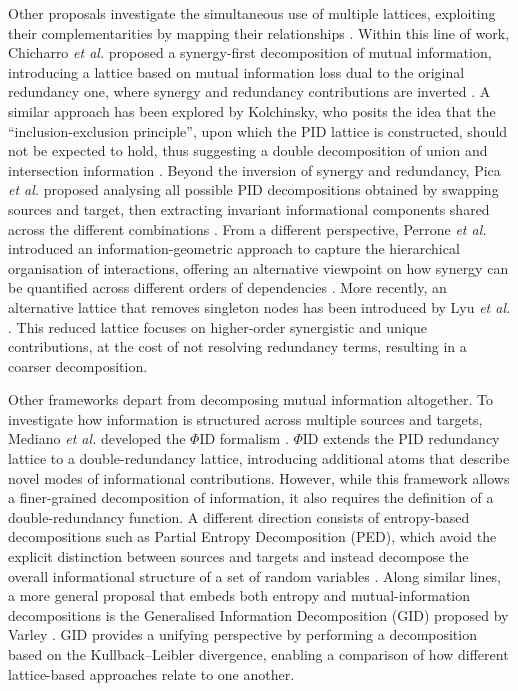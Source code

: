 \documentclass{article}
\makeatletter
\newcommand{\etal}{\textit{et al.\@} }
\makeatother
\begin{document}
Other proposals investigate the simultaneous use of multiple lattices, exploiting their complementarities by mapping their relationships \cite{chicharro2017synergy, kolchinsky2022novel}.
Within this line of work, Chicharro \etal proposed a synergy-first decomposition of mutual information, introducing a lattice based on mutual information loss dual to the original redundancy one, where synergy and redundancy contributions are inverted \cite{chicharro2017synergy}.
A similar approach has been explored by Kolchinsky, who posits the idea that the ``inclusion-exclusion principle'', upon which the PID lattice is constructed, should not be expected to hold, thus suggesting a double decomposition of union and intersection information \cite{kolchinsky2022novel}.
Beyond the inversion of synergy and redundancy, Pica \etal proposed analysing all possible PID decompositions obtained by swapping sources and target, then extracting invariant informational components shared across the different combinations \cite{pica2017invariant}.
From a different perspective, Perrone \etal introduced an information-geometric approach to capture the hierarchical organisation of interactions, offering an alternative viewpoint on how synergy can be quantified across different orders of dependencies \cite{perrone2016hierarchical}. 
More recently, an alternative lattice that removes singleton nodes has been introduced by Lyu \etal \cite{lyu2025whole}. 
This reduced lattice focuses on higher-order synergistic and unique contributions, at the cost of not resolving redundancy terms, resulting in a coarser decomposition. 

Other frameworks depart from decomposing mutual information altogether. 
To investigate how information is structured across multiple sources and targets, Mediano \etal developed the $\Phi$ID formalism \cite{mediano2025toward}. $\Phi$ID extends the PID redundancy lattice to a double-redundancy lattice, introducing additional atoms that describe novel modes of informational contributions. 
However, while this framework allows a finer-grained decomposition of information, it also requires the definition of a double-redundancy function.
A different direction consists of entropy-based decompositions such as Partial Entropy Decomposition (PED), which avoid the explicit distinction between sources and targets and instead decompose the overall informational structure of a set of random variables \cite{ince2017partial, varley2023partial}. 
Along similar lines, a more general proposal that embeds both entropy and mutual-information decompositions is the Generalised Information Decomposition (GID) proposed by Varley \cite{varley2024generalized}. GID provides a unifying perspective by performing a decomposition based on the Kullback–Leibler divergence, enabling a comparison of how different lattice-based approaches relate to one another. 
\end{document}

